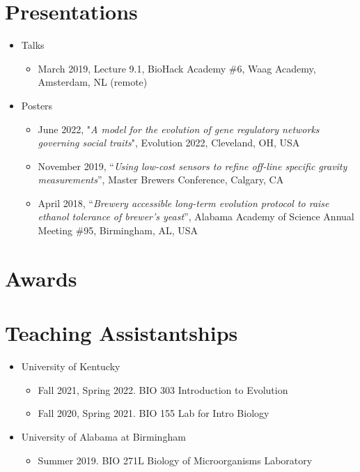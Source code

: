 \documentclass[11pt]{article}
\begin{document}
    \section*{Presentations}
        \begin{itemize}[leftmargin=.25in]
            \item Talks
                \begin{itemize}
                    \item March 2019, Lecture 9.1, BioHack Academy \#6, Waag Academy, Amsterdam, NL (remote)
                \end{itemize}
            \item Posters
                \begin{itemize}
                    \item June 2022, "{\it A model for the evolution of gene regulatory networks governing social traits}", Evolution 2022, Cleveland, OH, USA 
                    \item November 2019, “{\it Using low-cost sensors to refine off-line specific gravity measurements}”, Master Brewers Conference, Calgary, CA
                    \item April 2018, “{\it Brewery accessible long-term evolution protocol to raise ethanol tolerance of brewer’s yeast}”, Alabama Academy of Science Annual Meeting \#95, Birmingham, AL, USA
                \end{itemize}
        \end{itemize}


    \section*{Awards}


    \section*{Teaching Assistantships}
        \begin{itemize}[leftmargin=.25in]
            \item University of Kentucky
                \begin{itemize}
                \item Fall 2021, Spring 2022. BIO 303 Introduction to Evolution
                \item Fall 2020, Spring 2021. BIO 155 Lab for Intro Biology
                \end{itemize}
            \item University of Alabama at Birmingham
                \begin{itemize}
                \item Summer 2019. BIO 271L Biology of Microorganisms Laboratory
                \end{itemize}
        \end{itemize}
\end{document}
